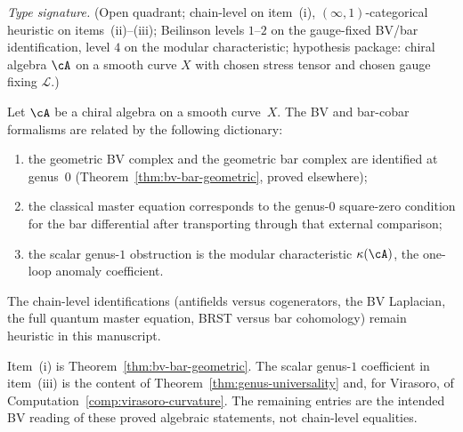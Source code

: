 \begin{remark}
\label{rem:bv-bar-bridge}
\emph{Type signature.} (Open quadrant; chain-level on item~(i),
$(\infty, 1)$-categorical heuristic on items~(ii)--(iii); Beilinson
levels $1$--$2$ on the gauge-fixed BV/bar identification, level $4$
on the modular characteristic; hypothesis package: chiral algebra
$\cA$ on a smooth curve $X$ with chosen stress tensor and chosen
gauge fixing $\mathcal L$.)

Let $\cA$ be a chiral algebra on a smooth curve~$X$. The BV and
bar-cobar formalisms are related by the following dictionary:
\begin{enumerate}[label=\textup{(\roman*)}]
\item the geometric BV complex and the geometric bar complex are
 identified at genus~$0$
 \textup{(}Theorem~\textup{\ref{thm:bv-bar-geometric}}, proved
 elsewhere\textup{)};
\item the classical master equation corresponds to the
 genus-$0$ square-zero condition for the bar differential after
 transporting through that external comparison;
\item the scalar genus-$1$ obstruction is the modular characteristic
 $\kappa(\cA)$, the one-loop anomaly
 coefficient.
\end{enumerate}
The chain-level identifications (antifields versus
cogenerators, the BV Laplacian, the full quantum master equation,
BRST versus bar cohomology) remain heuristic in this manuscript.

Item~\textup{(i)} is Theorem~\ref{thm:bv-bar-geometric}. The scalar
genus-$1$ coefficient in item~\textup{(iii)} is the content of
Theorem~\ref{thm:genus-universality} and, for Virasoro, of
Computation~\ref{comp:virasoro-curvature}. The remaining entries are
the intended BV reading of these proved algebraic statements, not
chain-level equalities.
\end{remark}

